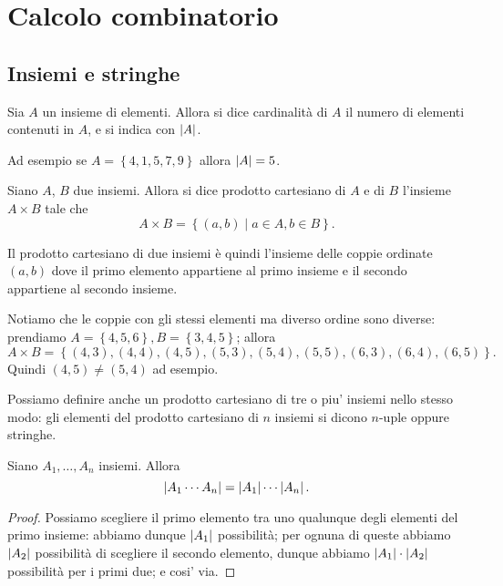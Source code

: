 \chapter{Calcolo combinatorio}

\section{Insiemi e stringhe}

\begin{definition}
    Sia $A$ un insieme di elementi. Allora si dice cardinalità di $A$ il numero di elementi contenuti in $A$, e si indica con $\left|A\right|$.
\end{definition}
Ad esempio se $A = \left\{ 4, 1, 5, 7, 9\right\}$ allora $\left|A\right| = 5$.

\begin{definition}
    Siano $A$, $B$ due insiemi. Allora si dice prodotto cartesiano di $A$ e di $B$ l'insieme $A \times B$ tale che \[
        A \times B = \left\{ (a, b) \mid a \in A, b \in B\right\}   
    .\]
\end{definition}
Il prodotto cartesiano di due insiemi è quindi l'insieme delle coppie ordinate $(a, b)$ dove il primo elemento appartiene al primo insieme e il secondo appartiene al secondo insieme. 

Notiamo che le coppie con gli stessi elementi ma diverso ordine sono diverse: prendiamo $A = \left\{ 4, 5, 6 \right\}, B = \left\{ 3, 4, 5 \right\}$; allora \[
    A \times B = \left\{ (4, 3), (4, 4), (4, 5), (5, 3), (5, 4), (5, 5), (6, 3), (6, 4), (6, 5)\right\}   
.\] Quindi $(4, 5) \neq (5, 4)$ ad esempio.

Possiamo definire anche un prodotto cartesiano di tre o piu' insiemi nello stesso modo: gli elementi del prodotto cartesiano di $n$ insiemi si dicono $n$-uple oppure stringhe.

\begin{proposition}\label{cardinalita_prodotto_cartesiano}
    Siano $A_1, \dots, A_n$ insiemi. Allora \begin{equation}
        \left|A_1 \cdots A_n\right| = \left|A_1\right| \cdots \left|A_n\right|.
    \end{equation}
\end{proposition}
\begin{proof}
    Possiamo scegliere il primo elemento tra uno qualunque degli elementi del primo insieme: abbiamo dunque $\left|A_1\right|$ possibilità; per ognuna di queste abbiamo $\left|A_2\right|$ possibilità di scegliere il secondo elemento, dunque abbiamo $\left|A_1\right| \cdot \left|A_2\right|$ possibilità per i primi due; e cosi' via.
\end{proof}

